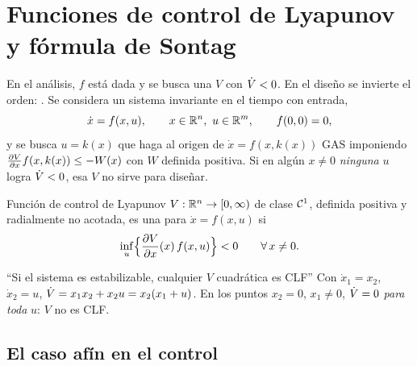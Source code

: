 \section{Funciones de control de Lyapunov y fórmula de Sontag}
\label{sec:av-clf}

En el análisis, $f$ está dada y se busca una $V$ con $\dot V<0$. En el diseño se invierte el orden: . Se considera un sistema invariante en el tiempo con entrada,
\[
  \dot x=f(x,u),\qquad x\in\R^n,\ u\in\R^m,\qquad f(0,0)=0,
\]
y se busca $u=k(x)$ que haga al origen de $\dot x=f(x,k(x))$ GAS imponiendo $\frac{\partial V}{\partial x} f(x,k(x))\le-W(x)$ con $W$ definida positiva. Si en algún $x\neq0$ \emph{ninguna} $u$ logra $\dot V<0$, esa $V$ no sirve para diseñar.

\begin{definicion}[label=def:av-clf]{Función de control de Lyapunov \citep{Ars83,Son83}}
$V:\mathbb{R}^n\to[0,\infty)$ de clase $\mathcal{C}^{1}$, definida positiva y radialmente no acotada, es una  para $\dot x=f(x,u)$ si
\[
  \inf_u\Bigl\{\frac{\partial V}{\partial x}(x)\,f(x,u)\Bigr\}<0\qquad\forall\,x\neq0 .
\]
\end{definicion}

\begin{trampa}[label=tr:av-noclf]{``Si el sistema es estabilizable, cualquier $V$ cuadrática es CLF''}
Con $\dot x_1=x_2$, $\dot x_2=u$, $\dot V=x_1x_2+x_2u=x_2(x_1+u)$. En los puntos $x_2=0$, $x_1\neq0$, $\dot V=0$ \emph{para toda} $u$: $V$ no es CLF.
\end{trampa}

\subsection{El caso afín en el control}

